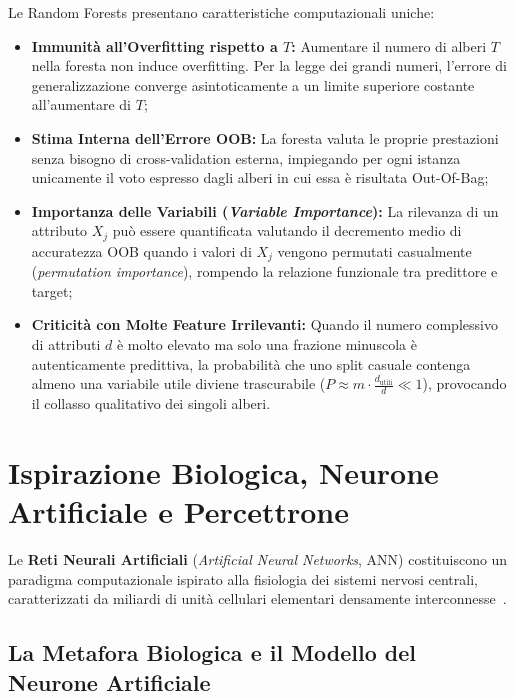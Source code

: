 Le Random Forests presentano caratteristiche computazionali uniche:
\begin{itemize}
    \item \textbf{Immunità all'Overfitting rispetto a $T$:} Aumentare il numero di alberi $T$ nella foresta non induce overfitting. Per la legge dei grandi numeri, l'errore di generalizzazione converge asintoticamente a un limite superiore costante all'aumentare di $T$;
    \item \textbf{Stima Interna dell'Errore OOB:} La foresta valuta le proprie prestazioni senza bisogno di cross-validation esterna, impiegando per ogni istanza unicamente il voto espresso dagli alberi in cui essa è risultata Out-Of-Bag;
    \item \textbf{Importanza delle Variabili (\textit{Variable Importance}):} La rilevanza di un attributo $X_j$ può essere quantificata valutando il decremento medio di accuratezza OOB quando i valori di $X_j$ vengono permutati casualmente (\textit{permutation importance}), rompendo la relazione funzionale tra predittore e target;
    \item \textbf{Criticità con Molte Feature Irrilevanti:} Quando il numero complessivo di attributi $d$ è molto elevato ma solo una frazione minuscola è autenticamente predittiva, la probabilità che uno split casuale contenga almeno una variabile utile diviene trascurabile ($P \approx m \cdot \frac{d_{\text{utili}}}{d} \ll 1$), provocando il collasso qualitativo dei singoli alberi.
\end{itemize}

\FloatBarrier
\section{Ispirazione Biologica, Neurone Artificiale e Percettrone}
\label{sec:dm-neural-networks-perceptron}

Le \textbf{Reti Neurali Artificiali} (\textit{Artificial Neural Networks}, ANN) costituiscono un paradigma computazionale ispirato alla fisiologia dei sistemi nervosi centrali, caratterizzati da miliardi di unità cellulari elementari densamente interconnesse~\cite{rosenblatt1958}.

\FloatBarrier
\subsection{La Metafora Biologica e il Modello del Neurone Artificiale}
\label{subsec:dm-biological-metaphor}

